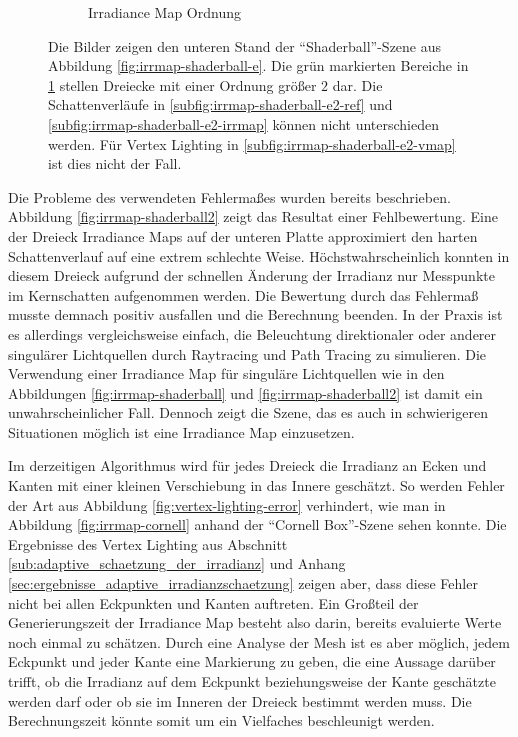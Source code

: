 \begin{figure}[h]
\begin{subfigure}[t]{\textwidth}
				\caption{Irradiance Map Ordnung}
				\label{subfig:irrmap-shaderball-e2-irrmap-order}
			\end{subfigure}
			\caption[Irradiance Map der \enquote{Shaderball}-Szene mit der \enquote{Ennis-Brown House}-HDR]{Die Bilder zeigen den unteren Stand der \enquote{Shaderball}-Szene aus Abbildung \ref{fig:irrmap-shaderball-e}. Die grün markierten Bereiche in \ref{subfig:irrmap-shaderball-e2-irrmap-order} stellen Dreiecke mit einer Ordnung größer $2$ dar. Die Schattenverläufe in \ref{subfig:irrmap-shaderball-e2-ref} und \ref{subfig:irrmap-shaderball-e2-irrmap} können nicht unterschieden werden. Für Vertex Lighting in \ref{subfig:irrmap-shaderball-e2-vmap} ist dies nicht der Fall.}
			\label{fig:irrmap-shaderball-e2}
		\end{figure}

		Die Probleme des verwendeten Fehlermaßes wurden bereits beschrieben.
		Abbildung \ref{fig:irrmap-shaderball2} zeigt das Resultat einer Fehlbewertung.
		Eine der Dreieck Irradiance Maps auf der unteren Platte approximiert den harten Schattenverlauf auf eine extrem schlechte Weise.
		Höchstwahrscheinlich konnten in diesem Dreieck aufgrund der schnellen Änderung der Irradianz nur Messpunkte im Kernschatten aufgenommen werden.
		Die Bewertung durch das Fehlermaß musste demnach positiv ausfallen und die Berechnung beenden.
		In der Praxis ist es allerdings vergleichsweise einfach, die Beleuchtung direktionaler oder anderer singulärer Lichtquellen durch Raytracing und Path Tracing zu simulieren.
		Die Verwendung einer Irradiance Map für singuläre Lichtquellen wie in den Abbildungen \ref{fig:irrmap-shaderball} und \ref{fig:irrmap-shaderball2} ist damit ein unwahrscheinlicher Fall.
		Dennoch zeigt die Szene, das es auch in schwierigeren Situationen möglich ist eine Irradiance Map einzusetzen.


		Im derzeitigen Algorithmus wird für jedes Dreieck die Irradianz an Ecken und Kanten mit einer kleinen Verschiebung in das Innere  geschätzt.
		So werden Fehler der Art aus Abbildung \ref{fig:vertex-lighting-error} verhindert, wie man in Abbildung \ref{fig:irrmap-cornell} anhand der \enquote{Cornell Box}-Szene sehen konnte.
		Die Ergebnisse des Vertex Lighting aus Abschnitt \ref{sub:adaptive_schaetzung_der_irradianz} und Anhang \ref{sec:ergebnisse_adaptive_irradianzschaetzung} zeigen aber, dass diese Fehler nicht bei allen Eckpunkten und Kanten auftreten.
		Ein Großteil der Generierungszeit der Irradiance Map besteht also darin, bereits evaluierte Werte noch einmal zu schätzen.
		Durch eine Analyse der Mesh ist es aber möglich, jedem Eckpunkt und jeder Kante eine Markierung zu geben, die eine Aussage darüber trifft, ob die Irradianz auf dem Eckpunkt beziehungsweise der Kante geschätzte werden darf oder ob sie im Inneren der Dreieck bestimmt werden muss.
		Die Berechnungszeit könnte somit um ein Vielfaches beschleunigt werden.



